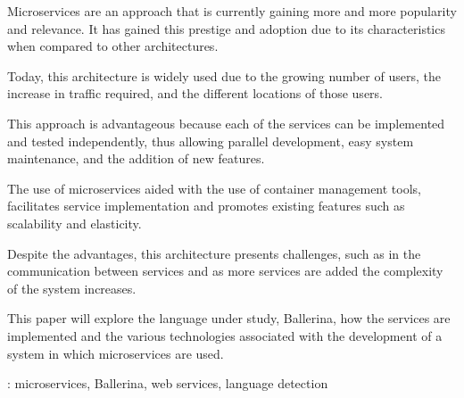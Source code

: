 \begin{secondlangabstract}

Microservices are an approach that is currently gaining more and more popularity and relevance. It has gained this prestige and adoption due to its characteristics when compared to other architectures.

Today, this architecture is widely used due to the growing number of users, the increase in traffic required, and the different locations of those users.

This approach is advantageous because each of the services can be implemented and tested independently, thus allowing parallel development, easy system maintenance, and the addition of new features.

The use of microservices aided with the use of container management tools, facilitates service implementation and promotes existing features such as scalability and elasticity.

Despite the advantages, this architecture presents challenges, such as in the communication between services and as more services are added the complexity of the system increases.

This paper will explore the language under study, Ballerina, how the services are implemented and the various technologies associated with the development of a system in which microservices are used. 



\vspace*{10mm} 
\noindent
\textbf{\keywordslabel}: microservices, Ballerina, web services, language detection

\end{secondlangabstract}

